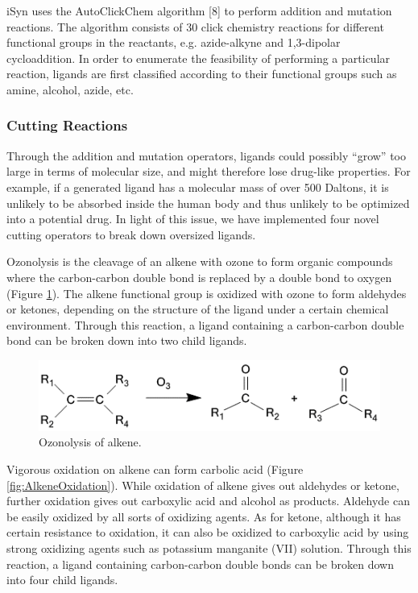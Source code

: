 iSyn uses the AutoClickChem algorithm [8] to perform addition and mutation reactions. The algorithm consists of 30 click chemistry reactions for different functional groups in the reactants, e.g. azide-alkyne and 1,3-dipolar cycloaddition. In order to enumerate the feasibility of performing a particular reaction, ligands are first classified according to their functional groups such as amine, alcohol, azide, etc.

\subsubsection{Cutting Reactions}

Through the addition and mutation operators, ligands could possibly “grow” too large in terms of molecular size, and might therefore lose drug-like properties. For example, if a generated ligand has a molecular mass of over 500 Daltons, it is unlikely to be absorbed inside the human body and thus unlikely to be optimized into a potential drug. In light of this issue, we have implemented four novel cutting operators to break down oversized ligands.

Ozonolysis is the cleavage of an alkene with ozone to form organic compounds where the carbon-carbon double bond is replaced by a double bond to oxygen (Figure \ref{fig:AlkeneOzonolysis}). The alkene functional group is oxidized with ozone to form aldehydes or ketones, depending on the structure of the ligand under a certain chemical environment. Through this reaction, a ligand containing a carbon-carbon double bond can be broken down into two child ligands.
 
\begin{figure}
\begin{center}
\includegraphics[width=\linewidth]{../isyn/AlkeneOzonolysis.png}
\end{center}
\caption{Ozonolysis of alkene.}
\label{fig:AlkeneOzonolysis}
\end{figure}

Vigorous oxidation on alkene can form carbolic acid (Figure \ref{fig:AlkeneOxidation}). While oxidation of alkene gives out aldehydes or ketone, further oxidation gives out carboxylic acid and alcohol as products. Aldehyde can be easily oxidized by all sorts of oxidizing agents. As for ketone, although it has certain resistance to oxidation, it can also be oxidized to carboxylic acid by using strong oxidizing agents such as potassium manganite (VII) solution. Through this reaction, a ligand containing carbon-carbon double bonds can be broken down into four child ligands.
 
